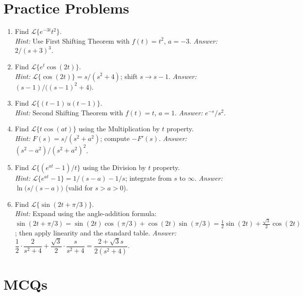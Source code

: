 \documentclass[12pt,a4paper]{article}
\begin{document}
\section{Practice Problems}

\begin{enumerate}

\item Find $\mathcal{L}\{e^{-3t}t^2\}$.\\
\textit{Hint:} Use First Shifting Theorem with $f(t)=t^2$, $a=-3$.
\textit{Answer:} $2/(s+3)^3$.

\item Find $\mathcal{L}\{e^{t}\cos(2t)\}$.\\
\textit{Hint:} $\mathcal{L}\{\cos(2t)\}=s/(s^2+4)$; shift $s\to s-1$.
\textit{Answer:} $(s-1)/\bigl((s-1)^2+4\bigr)$.

\item Find $\mathcal{L}\{(t-1)\,u(t-1)\}$.\\
\textit{Hint:} Second Shifting Theorem with $f(t)=t$, $a=1$.
\textit{Answer:} $e^{-s}/s^2$.

\item Find $\mathcal{L}\{t\cos(at)\}$ using the Multiplication by $t$ property.\\
\textit{Hint:} $F(s)=s/(s^2+a^2)$; compute $-F'(s)$.
\textit{Answer:} $(s^2-a^2)/(s^2+a^2)^2$.

\item Find $\mathcal{L}\{(e^{at}-1)/t\}$ using the Division by $t$ property.\\
\textit{Hint:} $\mathcal{L}\{e^{at}-1\}=1/(s-a)-1/s$; integrate from $s$ to $\infty$.
\textit{Answer:} $\ln\!
\bigl(s/(s-a)\bigr)$ (valid for $s > a > 0$).

\item Find $\mathcal{L}\{\sin(2t + \pi/3)\}$.\\
\textit{Hint:} Expand using the angle-addition formula:
$\sin(2t+\pi/3) = \sin(2t)\cos(\pi/3)+\cos(2t)\sin(\pi/3)
= \tfrac{1}{2}\sin(2t) + \tfrac{\sqrt{3}}{2}\cos(2t)$;
then apply linearity and the standard table.
\textit{Answer:} $\dfrac{1}{2}\cdot\dfrac{2}{s^2+4}+\dfrac{\sqrt{3}}{2}\cdot\dfrac{s}{s^2+4}
= \dfrac{2+\sqrt{3}s}{2(s^2+4)}$.

\end{enumerate}

\section{MCQs}
\end{document}
